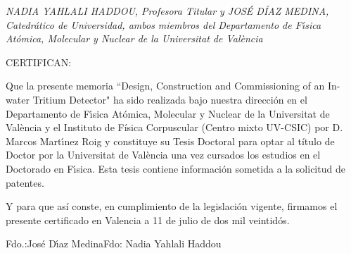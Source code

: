 

{\sl    NADIA YAHLALI HADDOU, Profesora Titular  y JOS\'E D\'IAZ MEDINA, Catedrático de  Universidad, ambos
miembros del Departamento de F\'{\i}sica At\'omica, Molecular y Nuclear
de la Universitat de València
\vspace{0.5cm}

        CERTIFICAN:
\vspace{0.7cm}

        Que la presente memoria ``Design, Construction and Commissioning of an In-water Tritium Detector"
ha sido realizada bajo nuestra direcci\'on en
el Departamento de F\'{\i}sica At\'omica, Molecular y Nuclear de la 
Universitat
de València y el Instituto de Física Corpuscular (Centro mixto UV-CSIC)  por D. Marcos Mart\'{\i}nez Roig y constituye su Tesis 
Doctoral para optar al título de Doctor por la Universitat de València una vez cursados los estudios en el Doctorado en F\'{\i}sica.
Esta tesis contiene información sometida a la solicitud de patentes.
\vspace{1.cm}

        Y para que así conste, en cumplimiento de la legislaci\'on vigente, firmamos
el presente certificado en Valencia a 11 de julio de dos mil veintidós.}
\vspace{1.cm}
\begin{center}
Fdo.:Jos\'e D\'{\i}az Medina\hfill Fdo: Nadia Yahlali Haddou
\end{center}